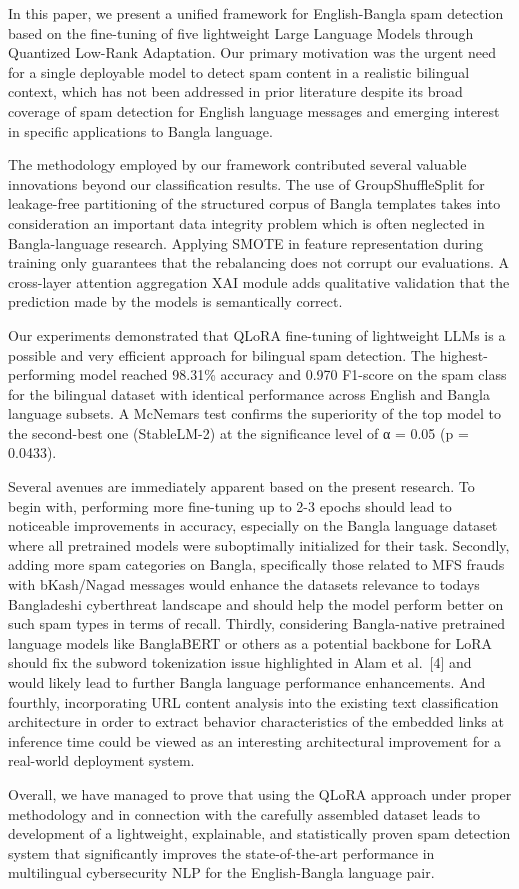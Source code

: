In this paper, we present a unified framework for English-Bangla spam
detection based on the fine-tuning of five lightweight Large Language
Models through Quantized Low-Rank Adaptation. Our primary motivation was
the urgent need for a single deployable model to detect spam content in
a realistic bilingual context, which has not been addressed in prior
literature despite its broad coverage of spam detection for English
language messages and emerging interest in specific applications to
Bangla language.

The methodology employed by our framework contributed several valuable
innovations beyond our classification results. The use of
GroupShuffleSplit for leakage-free partitioning of the structured corpus
of Bangla templates takes into consideration an important data integrity
problem which is often neglected in Bangla-language research. Applying
SMOTE in feature representation during training only guarantees that the
rebalancing does not corrupt our evaluations. A cross-layer attention
aggregation XAI module adds qualitative validation that the prediction
made by the models is semantically correct.

Our experiments demonstrated that QLoRA fine-tuning of lightweight LLMs
is a possible and very efficient approach for bilingual spam detection.
The highest-performing model reached 98.31\% accuracy and 0.970 F1-score
on the spam class for the bilingual dataset with identical performance
across English and Bangla language subsets. A McNemar\textquotesingle s
test confirms the superiority of the top model to the second-best one
(StableLM-2) at the significance level of α = 0.05 (p = 0.0433).

Several avenues are immediately apparent based on the present research.
To begin with, performing more fine-tuning up to 2-3 epochs should lead
to noticeable improvements in accuracy, especially on the Bangla
language dataset where all pretrained models were suboptimally
initialized for their task. Secondly, adding more spam categories on
Bangla, specifically those related to MFS frauds with bKash/Nagad
messages would enhance the dataset\textquotesingle s relevance to
today\textquotesingle s Bangladeshi cyberthreat landscape and should
help the model perform better on such spam types in terms of recall.
Thirdly, considering Bangla-native pretrained language models like
BanglaBERT or others as a potential backbone for LoRA should fix the
subword tokenization issue highlighted in Alam et al.~{[}4{]} and would
likely lead to further Bangla language performance enhancements. And
fourthly, incorporating URL content analysis into the existing text
classification architecture in order to extract behavior characteristics
of the embedded links at inference time could be viewed as an
interesting architectural improvement for a real-world deployment
system.

Overall, we have managed to prove that using the QLoRA approach under
proper methodology and in connection with the carefully assembled
dataset leads to development of a lightweight, explainable, and
statistically proven spam detection system that significantly improves
the state-of-the-art performance in multilingual cybersecurity NLP for
the English-Bangla language pair.
